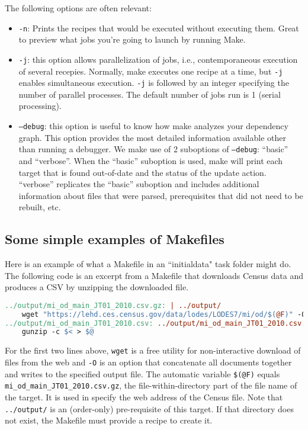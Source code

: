 The following options are often relevant:
\begin{itemize}
	\item \texttt{-n}: Prints the recipes that would be executed without executing them. Great to preview what jobs you're going to launch by running Make.
	\item \texttt{-j}: this option allows parallelization of jobs, i.e., contemporaneous execution of several recepies.
	Normally, make executes one recipe at a time, but \texttt{-j} enables simultaneous execution.
	\texttt{-j} is followed by an integer specifying the number of parallel processes.
	The default number of jobs run is 1 (serial processing).
	\item \texttt{--debug}: this option is useful to know how make analyzes your dependency graph. This option provides the most detailed information available other than running a debugger.
	We make use of 2 suboptions of \texttt{--debug}: ``basic'' and ``verbose''.
	When the ``basic'' suboption is used, make will print each target that is found out-of-date and the status of the update action.
	``verbose'' replicates the ``basic'' suboption and includes additional information about files that were parsed, prerequisites that did not need to be rebuilt, etc.
\end{itemize}

\subsection{Some simple examples of Makefiles}
Here is an example of what a Makefile in an ``initialdata" task folder might do.
The following code is an excerpt from a Makefile that downloads Census data and produces a CSV by unzipping the downloaded file.
\begin{lstlisting}[language=make]
../output/mi_od_main_JT01_2010.csv.gz: | ../output/
	wget "https://lehd.ces.census.gov/data/lodes/LODES7/mi/od/$(@F)" -O ../output/$(@F)
../output/mi_od_main_JT01_2010.csv: ../output/mi_od_main_JT01_2010.csv.gz
	gunzip -c $< > $@
\end{lstlisting}
For the first two lines above, \texttt{wget} is a free utility for non-interactive download of files from the web and \texttt{-O} is an option that concatenate all documents together and writes to the specified output file.
The automatic variable \texttt{\$(@F)} equals \texttt{mi\_od\_main\_JT01\_2010.csv.gz},
the file-within-directory part of the file name of the target.
It is used in specify the web address of the Census file.
Note that \texttt{../output/} is an (order-only) pre-requisite of this target.
If that directory does not exist, the Makefile must provide a recipe to create it.

